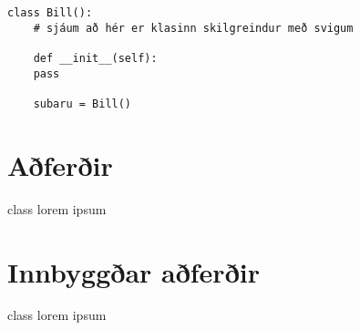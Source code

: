 
\begin{lstlisting}[caption=Klasar skilgreindir með töfraaðferðinni \_\_init\_\_, label=lst:klasar-notkun]
	class Bill():
	# sjáum að hér er klasinn skilgreindur með svigum
	
	def __init__(self):
	pass
	
	subaru = Bill()
\end{lstlisting}

\section{Aðferðir}\label{uk:klasar-aðferðir}
class lorem ipsum

\section{Innbyggðar aðferðir}\label{uk:klasar-innbyggðar-aðferðir}
class lorem ipsum